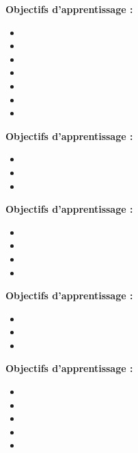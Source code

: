 \par\noindent\textbf{Objectifs d'apprentissage :}
\begin{itemize}
    \item \useobj[C4C2aa]
    \item \useobj[C4C2ab]
    \item \useobj[C4C2ac]
    \item \useobj[C4C2ad]
    \item \useobj[C4C2ae]
    \item \useobj[C4C2af]
    \item \useobj[C4C2ag]
\end{itemize}
\endsequence

\par\noindent\textbf{Objectifs d'apprentissage :}
\begin{itemize}
    \item \useobj[C4B2ca]
    \item \useobj[C4B2cb]
    \item \useobj[C4B2cc]
\end{itemize}
\endsequence

\par\noindent\textbf{Objectifs d'apprentissage :}
\begin{itemize}
    \item \useobj[C4B2ea]
    \item \useobj[C4B2ed]
    \item \useobj[C4B2ee]
    \item \useobj[C4B2ef]
\end{itemize}
\endsequence

\par\noindent\textbf{Objectifs d'apprentissage :}
\begin{itemize}
    \item \useobj[C4D2bc]
    \item \useobj[C4D2bd]
    \item \useobj[C4D2be]
\end{itemize}
\endsequence

\par\noindent\textbf{Objectifs d'apprentissage :}
\begin{itemize}
    \item \useobj[C4E2aa]
    \item \useobj[C4E2ab]
    \item \useobj[C4E2ac]
    \item \useobj[C4E2ad]
    \item \useobj[C4E2ae]
\end{itemize}
\endsequence

